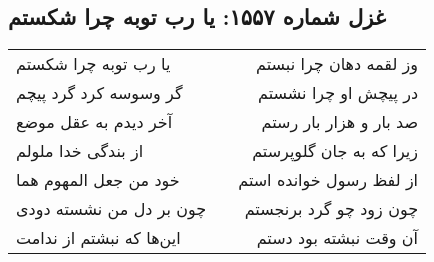 \begin{center}
\section*{غزل شماره ۱۵۵۷: یا رب توبه چرا شکستم}
\label{sec:1557}
\begin{longtable}{l p{0.5cm} r}
یا رب توبه چرا شکستم
&&
وز لقمه دهان چرا نبستم
\\
گر وسوسه کرد گرد پیچم
&&
در پیچش او چرا نشستم
\\
آخر دیدم به عقل موضع
&&
صد بار و هزار بار رستم
\\
از بندگی خدا ملولم
&&
زیرا که به جان گلوپرستم
\\
خود من جعل المهوم هما
&&
از لفظ رسول خوانده استم
\\
چون بر دل من نشسته دودی
&&
چون زود چو گرد برنجستم
\\
این‌ها که نبشتم از ندامت
&&
آن وقت نبشته بود دستم
\\
\end{longtable}
\end{center}
